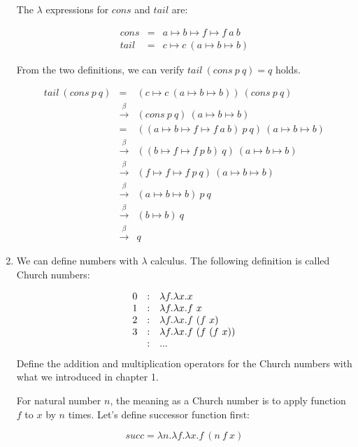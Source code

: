 \documentclass[UTF8]{article}
\begin{document}
\begin{enumerate}
The $\lambda$ expressions for $cons$ and $tail$ are:

\[
\begin{array}{rcl}
cons & = & a \mapsto b \mapsto f \mapsto f\ a\ b \\
tail & = & c \mapsto c\ (a \mapsto b \mapsto b)
\end{array}
\]

From the two definitions, we can verify $tail\ (cons\ p\ q) = q$ holds.

\[
\begin{array}{rcl}
tail\ (cons\ p\ q) & = & (c \mapsto c\ (a \mapsto b \mapsto b))\ (cons\ p\ q) \\
                   & \xrightarrow{\beta} & (cons\ p\ q)\ (a \mapsto b \mapsto b) \\
                   & = & ((a \mapsto b \mapsto f \mapsto f\ a\ b)\ p\ q)\ (a \mapsto b \mapsto b) \\
                   & \xrightarrow{\beta} & ((b \mapsto f \mapsto f\ p\ b)\ q)\ (a \mapsto b \mapsto b) \\
                   & \xrightarrow{\beta} & (f \mapsto f \mapsto f\ p\ q)\ (a \mapsto b \mapsto b) \\
                   & \xrightarrow{\beta} & (a \mapsto b \mapsto b)\ p\ q \\
                   & \xrightarrow{\beta} & (b \mapsto b)\ q \\
                   & \xrightarrow{\beta} & q
\end{array}
\]

\item {We can define numbers with $\lambda$ calculus. The following definition is called Church numbers:

\[
\begin{array}{r@{\quad:\quad}l}
0 & \lambda f . \lambda x . x \\
1 & \lambda f . \lambda x . f\ x \\
2 & \lambda f . \lambda x . f\ (f\ x) \\
3 & \lambda f . \lambda x . f\ (f\ (f\ x)) \\
  & ...
\end{array}
\]
Define the addition and multiplication operators for the Church numbers with what we introduced in chapter 1.
}

For natural number $n$, the meaning as a Church number is to apply function $f$ to $x$ by $n$ times. Let's define successor function first:

\[
succ = \lambda n . \lambda f . \lambda x . f\ (n\ f\ x)
\]


\end{enumerate}
\end{document}
